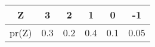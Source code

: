 \begin{tabular}{|c|c|c|c|c|c|}
\hline
Z 	&3	&2	&1	&0	&-1\\
\hline
pr(Z)	&0.3	&0.2	&0.4	&0.1	&0.05\\
\hline
\end{tabular}
